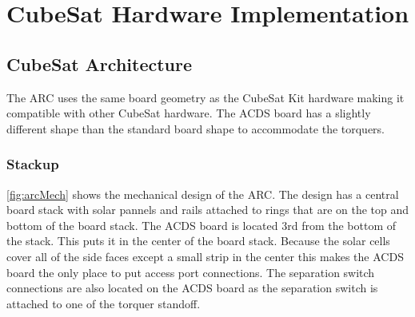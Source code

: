 
\chapter{CubeSat Hardware Implementation}

\label{ch:CubeSatHardware}

\section{CubeSat Architecture}


The \ac{ARC} uses the same board geometry as the CubeSat Kit\cite{CSK} hardware making it compatible with other CubeSat hardware. The \ac{ACDS} board has a slightly different shape than the standard board shape to accommodate the torquers.

\subsection{Stackup}

\autoref{fig:arcMech} shows the mechanical design of the \ac{ARC}. The design has a central board stack with solar pannels and rails attached to rings that are on the top and bottom of the board stack. The \ac{ACDS} board is located 3rd from the bottom of the stack. This puts it in the center of the board stack. Because the solar cells cover all of the side faces except a small strip in the center this makes the \ac{ACDS} board the only place to put access port connections. The separation switch connections are also located on the \ac{ACDS} board as the separation switch is attached to one of the torquer standoff.

